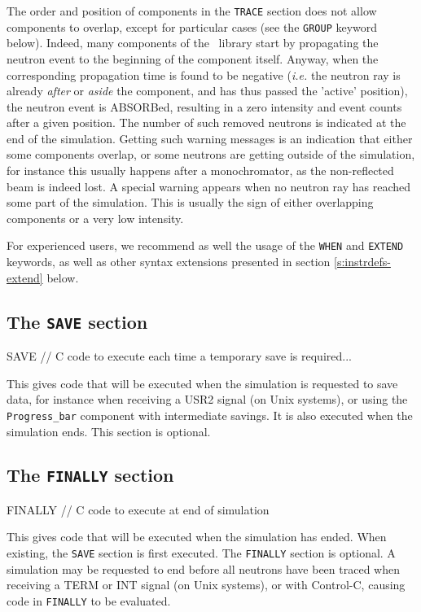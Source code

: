 The order and position of components in the \texttt{TRACE} section does not
allow components to overlap, except for particular cases (see the \texttt{GROUP}
keyword below).  Indeed, many components of the \MCS\ library
 start by propagating the neutron event to the
beginning of the component itself.  Anyway, when the corresponding propagation
time is found to be negative ({\it i.e.} the neutron ray is already \emph{after}
or \emph{aside} the component, and has thus passed the 'active' position), the
neutron event is ABSORBed, resulting in a zero intensity and event counts after
a given position. The number of such removed neutrons is indicated at the end of
the simulation.  Getting such warning messages is an indication that either some
components overlap, or some neutrons are getting outside of the simulation, for
instance this usually happens after a monochromator, as the non-reflected beam
is indeed lost. A special warning appears when no neutron ray has reached some
part of the simulation. This is usually the sign of either overlapping
components or a very low intensity. 

For experienced users, we recommend as well the usage of the \texttt{WHEN} and
\texttt{EXTEND} keywords, as well as other syntax extensions presented in
section \ref{s:instrdefs-extend} below.

\subsection{The \texttt{SAVE} section}
\label{s:save}

\begin{mcstas}
SAVE 
  // C code to execute each time a temporary save is required...
\end{mcstas} 

 This gives code that will be
executed when the simulation is requested to save data, for instance when
receiving a USR2 signal (on Unix systems), or using the \verb+Progress_bar+
component with intermediate savings. It is also executed when the simulation
ends. This section is optional.

\subsection{The \texttt{FINALLY} section}
\label{s:finally}

\begin{mcstas}
FINALLY
   // C code to execute at end of simulation
\end{mcstas}
This gives code that will be executed when the simulation has
ended. When existing, the \texttt{SAVE} section is first executed. The
\texttt{FINALLY} section is optional.
A simulation may be requested to end before all neutrons have been
traced when receiving a TERM or INT signal (on Unix systems), or with
Control-C, causing code in \texttt{FINALLY} to be evaluated.
 


